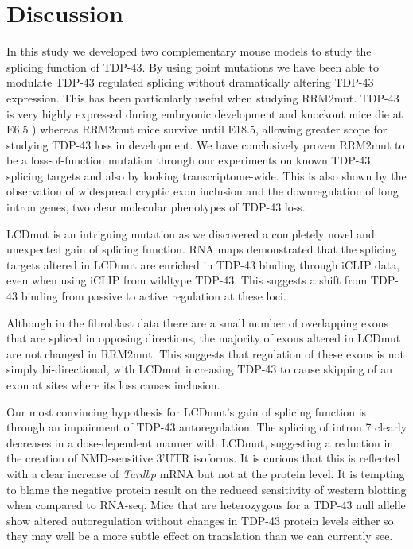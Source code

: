 \clearpage

\section{Discussion}

In this study we developed two complementary mouse models to study the splicing function of TDP-43. 
By using point mutations we have been able to modulate TDP-43 regulated splicing without dramatically altering TDP-43 expression. 
This has been particularly useful when studying RRM2mut. 
TDP-43 is very highly expressed during embryonic development and knockout mice die at E6.5 \citep{Ricketts2014}) whereas RRM2mut mice survive until E18.5, allowing greater scope for studying TDP-43 loss in development.
We have conclusively proven RRM2mut to be a loss-of-function mutation through our experiments on known TDP-43 splicing targets and also by looking transcriptome-wide. 
This is also shown by the observation of widespread cryptic exon inclusion and the downregulation of long intron genes, two clear molecular phenotypes of TDP-43 loss.

LCDmut is an intriguing mutation as we discovered a completely novel and unexpected gain of splicing function. 
RNA maps demonstrated that the splicing targets altered in LCDmut are enriched in TDP-43 binding through iCLIP data, even when using iCLIP from wildtype TDP-43. 
This suggests a shift from TDP-43 binding from passive to active regulation at these loci.

Although in the fibroblast data there are a small number of overlapping exons that are spliced in opposing directions, the majority of exons altered in LCDmut are not changed in RRM2mut. 
This suggests that regulation of these exons is not simply bi-directional, with LCDmut increasing TDP-43 to cause skipping of an exon at sites where its loss causes inclusion.

Our most convincing hypothesis for LCDmut's gain of splicing function is through an impairment of TDP-43 autoregulation. 
The splicing of intron 7 clearly decreases in a dose-dependent manner with LCDmut, suggesting a reduction in the creation of NMD-sensitive 3'UTR isoforms.
It is curious that this is reflected with a clear increase of \textit{Tardbp} mRNA but not at the protein level.
It is tempting to blame the negative protein result  on the reduced sensitivity of western blotting when compared to RNA-seq. 
Mice that are heterozygous for a TDP-43 null allelle show altered autoregulation without changes in TDP-43 protein levels either \citep{Ricketts2014} so they may well be a more subtle effect on translation than we can currently see.


